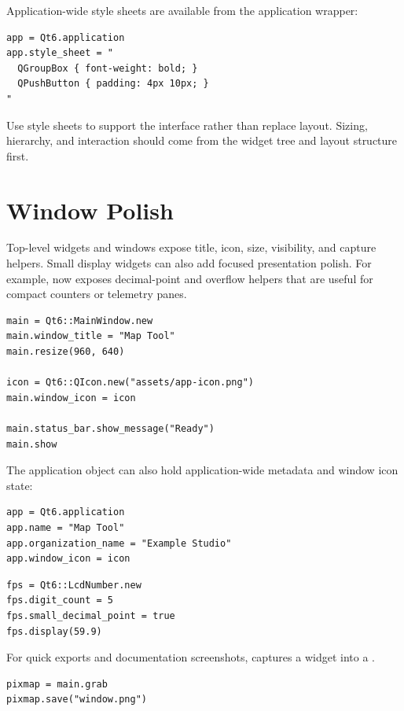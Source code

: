 Application-wide style sheets are available from the application wrapper:

\begin{lstlisting}[style=crystal]
app = Qt6.application
app.style_sheet = "
  QGroupBox { font-weight: bold; }
  QPushButton { padding: 4px 10px; }
"
\end{lstlisting}

Use style sheets to support the interface rather than replace layout. Sizing, hierarchy, and interaction should come from the widget tree and layout structure first.

\section{Window Polish}

Top-level widgets and windows expose title, icon, size, visibility, and capture helpers. Small display widgets can also add focused presentation polish. For example,  now exposes decimal-point and overflow helpers that are useful for compact counters or telemetry panes.

\begin{lstlisting}[style=crystal]
main = Qt6::MainWindow.new
main.window_title = "Map Tool"
main.resize(960, 640)

icon = Qt6::QIcon.new("assets/app-icon.png")
main.window_icon = icon

main.status_bar.show_message("Ready")
main.show
\end{lstlisting}

The application object can also hold application-wide metadata and window icon state:

\begin{lstlisting}[style=crystal]
app = Qt6.application
app.name = "Map Tool"
app.organization_name = "Example Studio"
app.window_icon = icon
\end{lstlisting}

\begin{lstlisting}[style=crystal]
fps = Qt6::LcdNumber.new
fps.digit_count = 5
fps.small_decimal_point = true
fps.display(59.9)
\end{lstlisting}

For quick exports and documentation screenshots,  captures a widget into a .

\begin{lstlisting}[style=crystal]
pixmap = main.grab
pixmap.save("window.png")
\end{lstlisting}


